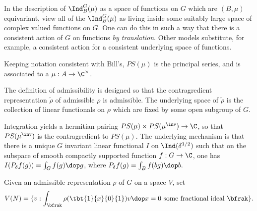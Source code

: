 

\def\Map{\rm Map}


In the description of $\Ind_B^G(\mu)$ as a space of functions on $G$ which are $(B,\mu)$  equivariant, view all of the $\Ind_B^G(\mu)$ as living inside some suitably large space of complex valued functions on $G$. One can do this in such a way that there is a consistent action of $G$ on functions \emph{by translation}. Other models substitute, for example, a consistent action for a consistent underlying space of functions. 

Keeping notation consistent with Bill's, $PS(\mu)$ is the principal series, and is associated to a $\mu : A \to \C^\times$. 

The definition of admissibility is designed so that the contragredient representation $\tilde{\rho}$ of admissible $\rho$ is admissible. The underlying space of $\tilde{\rho}$ is the collection of linear functionals on $\rho$ which are fixed by some open subgroup of $G$.

Integration yields a hermitian pairing $PS(\mu)\times PS(\mu^\inv ) \to \C$, so that $PS(\mu^\inv)$ is the contragredient to $PS(\mu)$. The underlying mechanism is that there is a unique $G$ invariant linear functional $I$ on $\Ind(\delta^{1/2})$ such that on the subspace of smooth compactly supported function $f: G \to \C$, one has $I(P_\delta f(g)) = \int_G f(g) \dop g$, where $P_\delta f(g) = \int _B f(bg) \dop b. $

Given an admissible representation $\rho$ of $G$ on a space $V$, set 
\[
	V(N) = \{ v  :  \int_\bfrak \rho(\tbt{1}{x}{0}{1} ) v \dop x = 0  \text{ some fractional ideal } \bfrak \}.
\]



